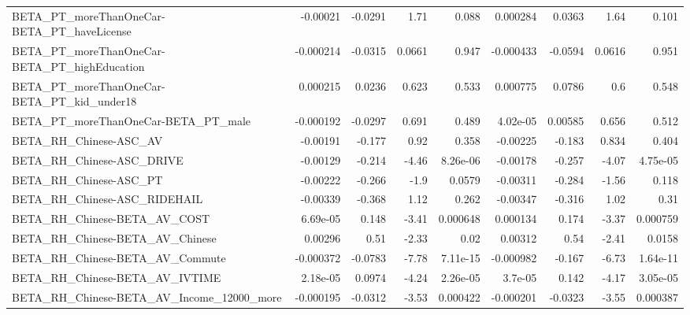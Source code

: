 \begin{tabular}{lrrrrrrrr}
BETA\_PT\_moreThanOneCar-BETA\_PT\_haveLicense         &    -0.00021 &      -0.0291 &      1.71 &    0.088 &   0.000284 &      0.0363 &         1.64 &         0.101 \\
BETA\_PT\_moreThanOneCar-BETA\_PT\_highEducation       &   -0.000214 &      -0.0315 &    0.0661 &    0.947 &  -0.000433 &     -0.0594 &       0.0616 &         0.951 \\
BETA\_PT\_moreThanOneCar-BETA\_PT\_kid\_under18         &    0.000215 &       0.0236 &     0.623 &    0.533 &   0.000775 &      0.0786 &          0.6 &         0.548 \\
BETA\_PT\_moreThanOneCar-BETA\_PT\_male                &   -0.000192 &      -0.0297 &     0.691 &    0.489 &   4.02e-05 &     0.00585 &        0.656 &         0.512 \\
BETA\_RH\_Chinese-ASC\_AV                             &    -0.00191 &       -0.177 &      0.92 &    0.358 &   -0.00225 &      -0.183 &        0.834 &         0.404 \\
BETA\_RH\_Chinese-ASC\_DRIVE                          &    -0.00129 &       -0.214 &     -4.46 & 8.26e-06 &   -0.00178 &      -0.257 &        -4.07 &      4.75e-05 \\
BETA\_RH\_Chinese-ASC\_PT                             &    -0.00222 &       -0.266 &      -1.9 &   0.0579 &   -0.00311 &      -0.284 &        -1.56 &         0.118 \\
BETA\_RH\_Chinese-ASC\_RIDEHAIL                       &    -0.00339 &       -0.368 &      1.12 &    0.262 &   -0.00347 &      -0.316 &         1.02 &          0.31 \\
BETA\_RH\_Chinese-BETA\_AV\_COST                       &    6.69e-05 &        0.148 &     -3.41 & 0.000648 &   0.000134 &       0.174 &        -3.37 &      0.000759 \\
BETA\_RH\_Chinese-BETA\_AV\_Chinese                    &     0.00296 &         0.51 &     -2.33 &     0.02 &    0.00312 &        0.54 &        -2.41 &        0.0158 \\
BETA\_RH\_Chinese-BETA\_AV\_Commute                    &   -0.000372 &      -0.0783 &     -7.78 & 7.11e-15 &  -0.000982 &      -0.167 &        -6.73 &      1.64e-11 \\
BETA\_RH\_Chinese-BETA\_AV\_IVTIME                     &    2.18e-05 &       0.0974 &     -4.24 & 2.26e-05 &    3.7e-05 &       0.142 &        -4.17 &      3.05e-05 \\
BETA\_RH\_Chinese-BETA\_AV\_Income\_12000\_more          &   -0.000195 &      -0.0312 &     -3.53 & 0.000422 &  -0.000201 &     -0.0323 &        -3.55 &      0.000387 \\

\end{tabular}
